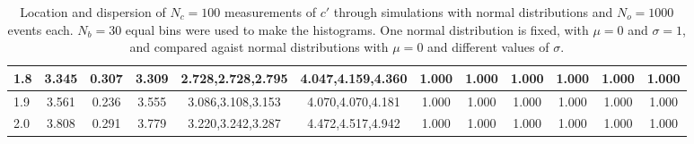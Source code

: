 \begin{table*}[h!]
\begin{center}
\begin{tabular}{| l | c | c | c | c | c | c | c | c | c | c | c |}
1.8 & 3.345 & 0.307 & 3.309 & 2.728,2.728,2.795 & 4.047,4.159,4.360  & 1.000  & 1.000  & 1.000  & 1.000  & 1.000  & 1.000 \\\hline
1.9 & 3.561 & 0.236 & 3.555 & 3.086,3.108,3.153 & 4.070,4.070,4.181  & 1.000  & 1.000  & 1.000  & 1.000  & 1.000  & 1.000 \\\hline
2.0 & 3.808 & 0.291 & 3.779 & 3.220,3.242,3.287 & 4.472,4.517,4.942  & 1.000  & 1.000  & 1.000  & 1.000  & 1.000  & 1.000 \\\hline
\end{tabular}
\caption{Location and dispersion of $N_c=100$
measurements of $c'$ through simulations
with normal distributions and $N_o=1000$ events each.
$N_b=30$ equal bins were used to make the histograms.
One normal distribution is fixed, with $\mu=0$ and $\sigma=1$,
and compared agaist normal distributions with $\mu=0$
and different values of $\sigma$.}
\end{center}
\end{table*}